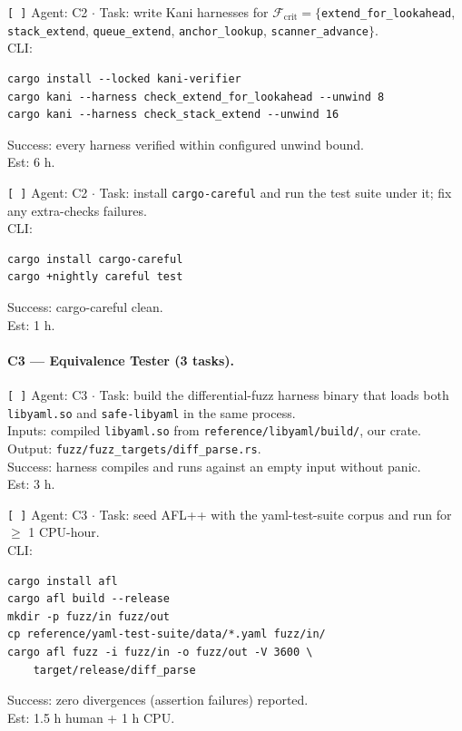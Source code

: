 \documentclass[12pt]{article}
\theoremstyle{definition}
\theoremstyle{remark}
\begin{document}
\begin{flushleft}
\texttt{[\,]} Agent: C2 \(\cdot\) Task: write Kani harnesses for
$\mathcal{F}_{\mathrm{crit}} = \{$\texttt{extend\_for\_lookahead},
\texttt{stack\_extend}, \texttt{queue\_extend},
\texttt{anchor\_lookup}, \texttt{scanner\_advance}$\}$.
\\
\quad CLI:
\begin{verbatim}
cargo install --locked kani-verifier
cargo kani --harness check_extend_for_lookahead --unwind 8
cargo kani --harness check_stack_extend --unwind 16
\end{verbatim}
\quad Success: every harness verified within configured unwind bound.
\\
\quad Est: 6 h.
\end{flushleft}

\begin{flushleft}
\texttt{[\,]} Agent: C2 \(\cdot\) Task: install
\texttt{cargo-careful} and run the test suite under it; fix any
extra-checks failures.
\\
\quad CLI:
\begin{verbatim}
cargo install cargo-careful
cargo +nightly careful test
\end{verbatim}
\quad Success: cargo-careful clean.
\\
\quad Est: 1 h.
\end{flushleft}

\paragraph{C3 --- Equivalence Tester (3 tasks).}

\begin{flushleft}
\texttt{[\,]} Agent: C3 \(\cdot\) Task: build the differential-fuzz
harness binary that loads both \texttt{libyaml.so} and
\texttt{safe-libyaml} in the same process.
\\
\quad Inputs: compiled \texttt{libyaml.so} from
\texttt{reference/libyaml/build/}, our crate.
\\
\quad Output: \texttt{fuzz/fuzz\_targets/diff\_parse.rs}.
\\
\quad Success: harness compiles and runs against an empty input
without panic.
\\
\quad Est: 3 h.
\end{flushleft}

\begin{flushleft}
\texttt{[\,]} Agent: C3 \(\cdot\) Task: seed AFL++ with the
yaml-test-suite corpus and run for $\ge$ 1 CPU-hour.
\\
\quad CLI:
\begin{verbatim}
cargo install afl
cargo afl build --release
mkdir -p fuzz/in fuzz/out
cp reference/yaml-test-suite/data/*.yaml fuzz/in/
cargo afl fuzz -i fuzz/in -o fuzz/out -V 3600 \
    target/release/diff_parse
\end{verbatim}
\quad Success: zero divergences (assertion failures) reported.
\\
\quad Est: 1.5 h human + 1 h CPU.
\end{flushleft}
\end{document}
